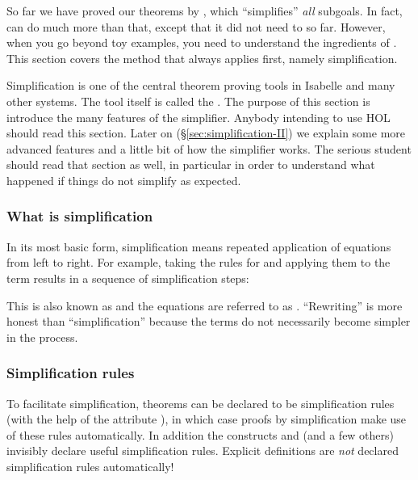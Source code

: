 So far we have proved our theorems by , which ``simplifies''
\emph{all} subgoals. In fact,  can do much more than that, except
that it did not need to so far. However, when you go beyond toy examples, you
need to understand the ingredients of .  This section covers the
method that  always applies first, namely simplification.

Simplification is one of the central theorem proving tools in Isabelle and
many other systems. The tool itself is called the . The
purpose of this section is introduce the many features of the simplifier.
Anybody intending to use HOL should read this section. Later on
(\S\ref{sec:simplification-II}) we explain some more advanced features and a
little bit of how the simplifier works. The serious student should read that
section as well, in particular in order to understand what happened if things
do not simplify as expected.

\subsubsection{What is simplification}

In its most basic form, simplification means repeated application of
equations from left to right. For example, taking the rules for \isa{\at}
and applying them to the term \isa{[0,1] \at\ []} results in a sequence of
simplification steps:
This is also known as  and the equations are referred
to as . ``Rewriting'' is more honest than ``simplification''
because the terms do not necessarily become simpler in the process.

\subsubsection{Simplification rules}

To facilitate simplification, theorems can be declared to be simplification
rules (with the help of the attribute \isa{[simp]}), in which case proofs by simplification make use of these
rules automatically. In addition the constructs  and
 (and a few others) invisibly declare useful
simplification rules. Explicit definitions are \emph{not} declared
simplification rules automatically!

